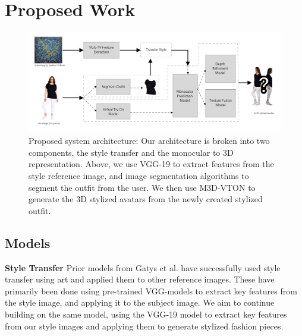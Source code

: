 \documentclass{article}
\begin{document}


\section{Proposed Work}


\begin{figure}[H]
    \centering
    \includegraphics[width=\textwidth]{report/diagrams/3d_sari.png}
    \caption{Proposed system architecture: Our architecture is broken into two components, the style transfer and the monocular to 3D representation. Above, we use VGG-19 to extract features from the style reference image, and image segmentation algorithms to segment the outfit from the user. We then use M3D-VTON to generate the 3D stylized avatars from the newly created stylized outfit.}
\end{figure}

\subsection{Models}
\textbf{Style Transfer} Prior models from Gatys et al.\cite{gatys2016styleTransfer} have successfully used style transfer using art and applied them to other reference images. These have primarily been done using pre-trained VGG-models to extract key features from the style image, and applying it to the subject image. We aim to continue building on the same model, using the VGG-19 model to extract key features from our style images and applying them to generate stylized fashion pieces. 
\end{document}
